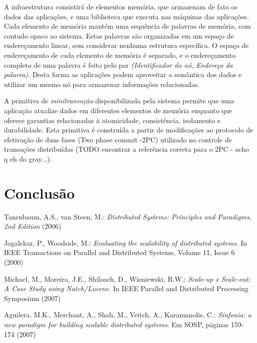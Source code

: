\documentclass[a4paper,12pt]{report}
\begin{document}
A infraestrutura consistirá de elementos memória, que armazenam de fato os dados das aplicações, e uma biblioteca que executa nas máquinas das aplicações. Cada elemento de memória mantém uma sequência de palavras de memória, com contudo opaco ao sistema. Estas palavras são organizadas em um espaço de endereçamento linear, sem considerar nenhuma estrutura específica. O espaço de endereçamento de cada elemento de memória é separado, e o endereçamento completo de uma palavra é feito pelo par {\em (Identificador do nó, Endereço da palavra)}. Desta forma as aplicações podem aproveitar a semântica dos dados e utilizar um mesmo nó para armazenar informações relacionadas.

A primitiva de {\em minitransação} disponibilizada pela sistema permite que uma aplicação atualize dados em diferentes elementos de memória enquanto que oferece garantias relacionadas à atomicidade, consistência, isolamento e durabilidade. Esta primitiva é construída a partir de modificações ao protocolo de efetivação de duas fases (Two phase commit -2PC) utilizado no controle de transações distribuídas (TODO encontrar a referência correta para o 2PC - acho q eh do gray...). 

\chapter{Conclusão}

\begin{thebibliography}{99}

 Tanenbaum, A.S., van Steen, M.: {\em Distributed Systems: Principles and Paradigms, 2nd Edition} (2006)

 Jogalekar, P., Woodside, M.: {\em Evaluating the scalability of distributed systems}. In IEEE Transactions on Parallel and Distributed Systems, Volume 11, Issue 6 (2000)

 Michael, M., Moreira, J.E., Shiloach, D., Wisniewski, R.W.: {\em Scale-up x Scale-out: A Case Study using Nutch/Lucene}. In IEEE Parallel and Distributed Processing Symposium (2007)

 Aguilera, M.K., Merchant, A., Shah, M., Veitch, A., Karamanolis, C.: {\em Sinfonia: a new paradigm for building scalable distributed systems}. Em SOSP, páginas 159-174 (2007)

\end{thebibliography}
\end{document}
